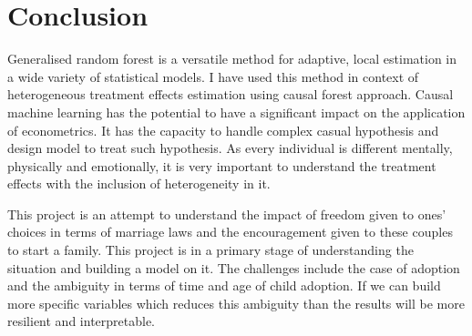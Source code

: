 \documentclass[11pt, a4paper, leqno]{article}
\begin{document}
\section{Conclusion} %
\label{sec:Conclusion}

Generalised random forest is a versatile method for adaptive, local estimation in a wide variety of statistical models. I have used this method
in context of heterogeneous treatment effects estimation using causal forest approach. Causal machine learning has the potential to have a
significant impact on the application of econometrics. It has the capacity to handle complex casual hypothesis and design model to treat such
hypothesis. As every individual is different mentally, physically and emotionally, it is very important to understand the treatment effects with
the inclusion of heterogeneity in it.

This project is an attempt to understand the impact of freedom given to ones' choices in terms of marriage laws and the encouragement given to
these couples to start a family. This project is in a primary stage of understanding the situation and building a model on it. The challenges
include the case of adoption and the ambiguity in terms of time and age of child adoption. If we can build more specific variables which reduces
this ambiguity than the results will be more resilient and interpretable.


%  

\printbibliography
{}



\end{document}
